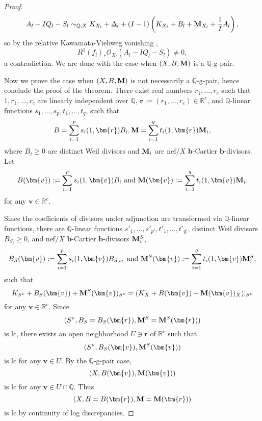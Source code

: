\documentclass[11pt]{amsart}
\numberwithin{equation}{section}
\newcommand{\bb}{\bm{b}}
\newcommand{\Mm}{{\bf{M}}}
\newcommand{\Qq}{\mathbb{Q}}
\theoremstyle{definition}
\theoremstyle{definition}
\theoremstyle{definition}
\begin{document}
\begin{proof}
$$A_l-IQ_l-S_l\sim_{\mathbb Q,X}K_{X_l}+\Delta_l+(I-1)\left(K_{X_l}+B_l+\Mm_{X_l}+\frac{1}{I}A_l\right),$$
so by the relative Kawamata-Viehweg vanishing \cite[Theorem 1-2-5]{KMM87}, $$R^1(f_{l})_*\mathcal{O}_{X_{l}}(A_{l}-IQ_{l}-S_{l})\not=0,$$
a contradiction. We are done with the case when $(X,B,\Mm)$ is a $\Qq$-g-pair.

\medskip

Now we prove the case when $(X,B,\Mm)$ is not necessarily a $\Qq$-g-pair, hence conclude the proof of the theorem. There exist real numbers $r_1,\dots,r_c$ such that $1,r_1,\dots,r_c$ are linearly independent over $\Qq$, $\bm{r}:=(r_1,\dots,r_c)\in\mathbb R^c$, and $\Qq$-linear functions $s_1,\dots,s_p,t_1,\dots,t_q$, such that
$$B=\sum_{i=1}^ps_i(1,\bm{r})B_i,\Mm=\sum_{i=1}^qt_i(1,\bm{r})\Mm_i,$$
where $B_i\geq 0$ are distinct Weil divisors and $\Mm_i$ are nef$/X$ $\bb$-Cartier $\bb$-divisors. Let 
$$B(\bm{v}):=\sum_{i=1}^ps_i(1,\bm{v})B_i\text{ and }\Mm(\bm{v}):=\sum_{i=1}^qt_i(1,\bm{v})\Mm_i,$$
for any $\bm{v}\in\mathbb R^c$. 

Since the coefficients of divisors under adjunction are transformed via $\Qq$-linear functions, there are $\Qq$-linear functions $s'_1,\dots,s'_{p'},t'_1,\dots,t'_{q'}$, distinct Weil divisors $B_{S_i}\geq 0$, and nef$/X$ $\bb$-Cartier $\bb$-divisors $\Mm^S_i$, 
$$B_S(\bm{v}):=\sum_{i=1}^ps_i(1,\bm{v})B_{S,i},\text{ and }\Mm^S(\bm{v}):=\sum_{i=1}^qt_i(1,\bm{v})\Mm^S_i,$$
such that
$$K_{S^\nu}+B_S(\bm{v})+\Mm^S(\bm{v})_{S^\nu}=(K_X+B(\bm{v})+\Mm(\bm{v})_X)|_{S^\nu}$$
for any $\bm{v}\in\mathbb R^c$. Since $$(S^\nu,B_S=B_S(\bm{r}),\Mm^S=\Mm^S(\bm{r}))$$ is lc, 
there exists an open neighborhood $U\ni\bm{r}$ of $\mathbb R^c$ such that
$$(S^\nu,B_S(\bm{v}),\Mm^S(\bm{v}))$$
is lc for any $\bm{v}\in U$. By the $\Qq$-g-pair case,
$$(X,B(\bm{v}),\Mm(\bm{v}))$$
is lc for any $\bm{v}\in U\cap\mathbb Q$. Thus $$(X,B=B(\bm{r}),\Mm=\Mm(\bm{r}))$$
is lc by continuity of log discrepancies.
\end{proof}
\end{document}
